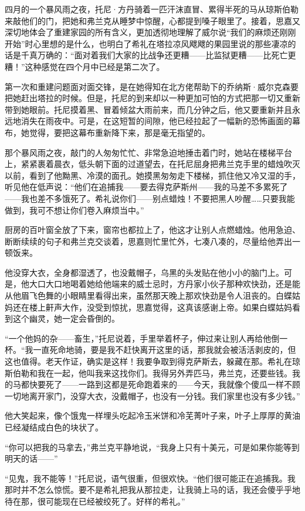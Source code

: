 \par 四月的一个暴风雨之夜，托尼·方丹骑着一匹汗沫直冒、累得半死的马从琼斯伯勒来敲他们的门，把她和弗兰克从睡梦中惊醒，心都提到嗓子眼里了。接着，思嘉又深切地体会了重建家园的所有含义，更加透彻地理解了威尔说“我们的麻烦还刚刚开始”时心里想的是什么，也明白了希礼在塔拉凉风飕飕的果园里说的那些凄凉的话是千真万确的：“面对着我们大家的比战争还更糟——比监狱更糟——比死亡更糟！”这种感觉在四个月中已经是第二次了。
\par 第一次和重建问题面对面交锋，是在她得知在北方佬帮助下的乔纳斯·威尔克森要把她赶出塔拉的时候。但是，托尼的到来却以一种更加可怕的方式把那一切又重新带到她眼前。托尼摸着黑、冒着倾盆大雨前来，而几分钟之后，他又要重新并且永远地消失在雨夜中。可是，在这短暂的间隙，他已经拉起了一幅新的恐怖画面的幕布，她觉得，要把这幕布重新降下来，那是毫无指望的。
\par 那个暴风雨之夜，敲门的人匆匆忙忙、非常急迫地捶击着门时，她站在楼梯平台上，紧紧裹着晨衣，低头朝下面的过道望去，在托尼屈身把弗兰克手里的蜡烛吹灭以前，看到了他黝黑、冷漠的面孔。她摸黑匆匆走下楼梯，抓住他又冷又湿的手，听见他在低声说：“他们在追捕我——要去得克萨斯州——我的马差不多累死了——我也差不多饿死了。希礼说你们——别点蜡烛！不要把黑人吵醒……只要我能做到，我可不想让你们卷入麻烦当中。”
\par 厨房的百叶窗全放了下来，窗帘也都拉上了，他这才让别人点燃蜡烛。他用急迫、断断续续的句子和弗兰克交谈着，思嘉则忙里忙外，七凑八凑的，尽量给他弄出一顿饭来。
\par 他没穿大衣，全身都湿透了，也没戴帽子，乌黑的头发贴在他小小的脑门上。可是，他大口大口地喝着她给他端来的威士忌时，方丹家小伙子那种欢快劲，还是能从他眉飞色舞的小眼睛里看得出来，虽然那天晚上那欢快劲是令人沮丧的。白蝶姑妈还在楼上鼾声大作，没受到惊扰，思嘉觉得，这真该感谢上帝。如果白蝶姑妈看到这个幽灵，她一定会昏倒的。
\par “一个他妈的杂——畜生，”托尼说着，手里举着杯子，伸过来让别人再给他倒一杯。“我一直死命地骑，要是我不赶快离开这里的话，那我就会被活活剥皮的，但这也值得。老天作证，确实是这样！我要争取到得克萨斯去，躲藏在那。希礼在琼斯伯勒和我在一起，他叫我来这找你们。我得另外弄匹马，弗兰克，还要些钱。我的马都快要死了——一路到这都是死命跑着来的——今天，我就像个傻瓜一样不顾一切地离开家门，没穿大衣，没戴帽子，也没有一分钱。我们家里也没有多少钱。”
\par 他大笑起来，像个饿鬼一样埋头吃起冷玉米饼和冷芜菁叶子来，叶子上厚厚的黄油已经凝结成白色的块状了。
\par “你可以把我的马拿去，”弗兰克平静地说，“我身上只有十美元，可是如果你能等到明天的话——”
\par “见鬼，我不能等！”托尼说，语气很重，但很欢快。“他们很可能正在追捕我。我那时并不怎么惊慌。要不是希礼把我从那拉走，让我骑上马的话，我还会傻乎乎地待在那，很可能现在已经被绞死了。好样的希礼。”
